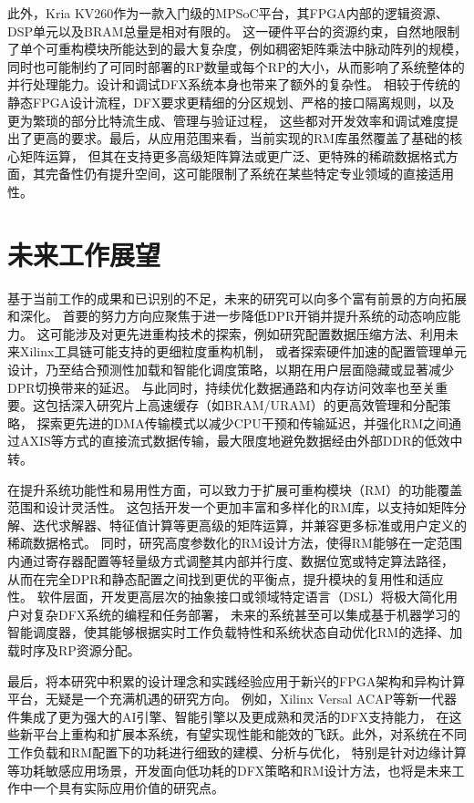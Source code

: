 此外，Kria KV260作为一款入门级的MPSoC平台，其FPGA内部的逻辑资源、DSP单元以及BRAM总量是相对有限的。
这一硬件平台的资源约束，自然地限制了单个可重构模块所能达到的最大复杂度，例如稠密矩阵乘法中脉动阵列的规模，
同时也可能制约了可同时部署的RP数量或每个RP的大小，从而影响了系统整体的并行处理能力。设计和调试DFX系统本身也带来了额外的复杂性。
相较于传统的静态FPGA设计流程，DFX要求更精细的分区规划、严格的接口隔离规则，以及更为繁琐的部分比特流生成、管理与验证过程，
这些都对开发效率和调试难度提出了更高的要求。最后，从应用范围来看，当前实现的RM库虽然覆盖了基础的核心矩阵运算，
但其在支持更多高级矩阵算法或更广泛、更特殊的稀疏数据格式方面，其完备性仍有提升空间，这可能限制了系统在某些特定专业领域的直接适用性。

\section{未来工作展望}

基于当前工作的成果和已识别的不足，未来的研究可以向多个富有前景的方向拓展和深化。
首要的努力方向应聚焦于进一步降低DPR开销并提升系统的动态响应能力。
这可能涉及对更先进重构技术的探索，例如研究配置数据压缩方法、利用未来Xilinx工具链可能支持的更细粒度重构机制，
或者探索硬件加速的配置管理单元设计，乃至结合预测性加载和智能化调度策略，以期在用户层面隐藏或显著减少DPR切换带来的延迟。
与此同时，持续优化数据通路和内存访问效率也至关重要。这包括深入研究片上高速缓存（如BRAM/URAM）的更高效管理和分配策略，
探索更先进的DMA传输模式以减少CPU干预和传输延迟，并强化RM之间通过AXIS等方式的直接流式数据传输，最大限度地避免数据经由外部DDR的低效中转。

在提升系统功能性和易用性方面，可以致力于扩展可重构模块（RM）的功能覆盖范围和设计灵活性。
这包括开发一个更加丰富和多样化的RM库，以支持如矩阵分解、迭代求解器、特征值计算等更高级的矩阵运算，并兼容更多标准或用户定义的稀疏数据格式。
同时，研究高度参数化的RM设计方法，使得RM能够在一定范围内通过寄存器配置等轻量级方式调整其内部并行度、数据位宽或特定算法路径，
从而在完全DPR和静态配置之间找到更优的平衡点，提升模块的复用性和适应性。
软件层面，开发更高层次的抽象接口或领域特定语言（DSL）将极大简化用户对复杂DFX系统的编程和任务部署，
未来的系统甚至可以集成基于机器学习的智能调度器，使其能够根据实时工作负载特性和系统状态自动优化RM的选择、加载时序及RP资源分配。

最后，将本研究中积累的设计理念和实践经验应用于新兴的FPGA架构和异构计算平台，无疑是一个充满机遇的研究方向。
例如，Xilinx Versal ACAP等新一代器件集成了更为强大的AI引擎、智能引擎以及更成熟和灵活的DFX支持能力，
在这些新平台上重构和扩展本系统，有望实现性能和能效的飞跃。此外，对系统在不同工作负载和RM配置下的功耗进行细致的建模、分析与优化，
特别是针对边缘计算等功耗敏感应用场景，开发面向低功耗的DFX策略和RM设计方法，也将是未来工作中一个具有实际应用价值的研究点。
